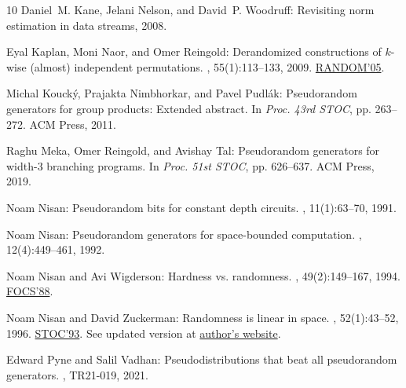 \documentclass[11pt]{article}
\begin{document}
\begin{thebibliography}{10}
{\sc Daniel~M. Kane, Jelani Nelson, and David~P. Woodruff}: Revisiting norm
  estimation in data streams, 2008.

{\sc Eyal Kaplan, Moni Naor, and Omer Reingold}: Derandomized constructions of
  $k$-wise (almost) independent permutations.
, 55(1):113--133, 2009.
\newblock \prelim \href{https://doi.org/10.1007/11538462\_30}{RANDOM'05}.
\newblock [\epfmtdoi{10.1007/s00453-008-9267-y}]

{\sc Michal Kouck{\'y}, Prajakta Nimbhorkar, and Pavel Pudl{\'a}k}:
  Pseudorandom generators for group products: {E}xtended abstract.
\newblock In {\em Proc. 43rd STOC}, pp. 263--272. ACM Press, 2011.
\newblock [\epfmtdoi{10.1145/1993636.1993672}]

{\sc Raghu Meka, Omer Reingold, and Avishay Tal}: Pseudorandom generators for
  width-3 branching programs.
\newblock In {\em Proc. 51st STOC}, pp. 626--637. ACM Press, 2019.
\newblock [\epfmtdoi{10.1145/3313276.3316319}]

{\sc Noam Nisan}: Pseudorandom bits for constant depth circuits.
, 11(1):63--70, 1991.
\newblock [\epfmtdoi{10.1007/BF01375474}]

{\sc Noam Nisan}: Pseudorandom generators for space-bounded computation.
, 12(4):449--461, 1992.
\newblock [\epfmtdoi{10.1007/bf01305237}]

{\sc Noam Nisan and Avi Wigderson}: Hardness vs. randomness.
, 49(2):149--167, 1994.
\newblock \prelim \href{https://doi.org/10.1109/SFCS.1988.21916}{FOCS'88}.
\newblock [\epfmtdoi{10.1016/S0022-0000(05)80043-1}]

{\sc Noam Nisan and David Zuckerman}: Randomness is linear in space.
, 52(1):43--52, 1996.
\newblock \prelim \href{https://doi.org/10.1145/167088.167162}{STOC'93}. See
  updated version at
  \href{https://www.cs.utexas.edu/~diz/Sub\%20Websites/Research/Randomness\_is\_linear\_in\_space.pdf}{author's
  website}.

{\sc Edward Pyne and Salil Vadhan}: Pseudodistributions that beat all
  pseudorandom generators.
, TR21-019, 2021.


\end{thebibliography}
\end{document}
